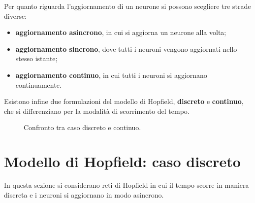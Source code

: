 \noindent Per quanto riguarda l'aggiornamento di un neurone si possono scegliere tre strade diverse:
\begin{itemize}
	\item \textbf{aggiornamento asincrono}, in cui si aggiorna un neurone alla volta;
	\item \textbf{aggiornamento sincrono}, dove tutti i neuroni vengono aggiornati nello stesso istante;
	\item \textbf{aggiornamento continuo}, in cui tutti i neuroni si aggiornano continuamente.
\end{itemize}
Esistono infine due formulazioni del modello di Hopfield, \textbf{discreto} e \textbf{continuo}, che si differenziano per la modalità di scorrimento del tempo.

\begin{figure}[h!]
	\centering
	\quad
	\caption{Confronto tra caso discreto e continuo.}
\end{figure}

\section{Modello di Hopfield: caso discreto}
\label{sec:modello_di_hopfield_caso_discreto}

In questa sezione si considerano reti di Hopfield in cui il tempo scorre in maniera discreta e i neuroni si aggiornano in modo asincrono.

